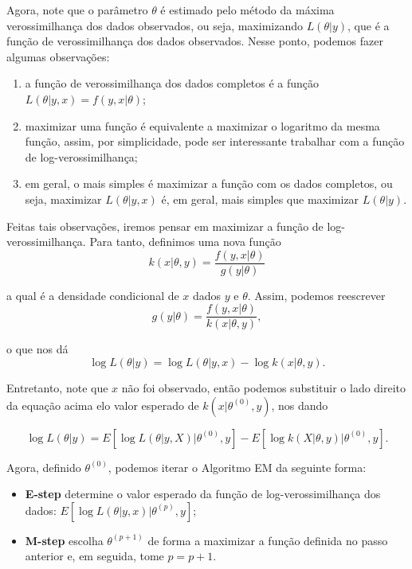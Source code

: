 \documentclass{article}
\begin{document}
Agora, note que o parâmetro $\theta$ é estimado pelo método da máxima verossimilhança dos dados observados, ou seja, maximizando $L(\theta | y)$, que é a função de verossimilhança dos dados observados. Nesse ponto, podemos fazer algumas observações:
\begin{enumerate}
    \item
        a função de verossimilhança dos dados completos é a função $L(\theta | y, x) = f(y, x | \theta)$;
        
    \item
        maximizar uma função é equivalente a maximizar o logaritmo da mesma função, assim, por simplicidade, pode ser interessante trabalhar com a função de log-verossimilhança;
        
    \item
        em geral, o mais simples é maximizar a função com os dados completos, ou seja, maximizar $L(\theta | y, x)$ é, em geral, mais simples que maximizar $L(\theta | y)$.
\end{enumerate}

Feitas tais observações, iremos pensar em maximizar a função de log-verossimilhança. Para tanto, definimos uma nova função
\[k(x | \theta, y) = \dfrac{f(y, x | \theta)}{g(y | \theta)}\]

\noindent a qual é a densidade condicional de $x$ dados $y$ e $\theta$. Assim, podemos reescrever
\[g(y | \theta) = \dfrac{f(y, x | \theta)}{k(x | \theta, y)},\]

\noindent o que nos dá
\[\log{L(\theta | y)} = \log{L(\theta | y, x)} - \log{k(x | \theta, y)}.\]

Entretanto, note que $x$ não foi observado, então podemos substituir o lado direito da equação acima elo valor esperado de $k(x | \theta^{(0)}, y)$, nos dando

\[\log{L(\theta | y)} = E\left[\log{L(\theta | y, X)} | \theta^{(0)}, y\right] - E\left[\log{k(X | \theta, y)} | \theta^{(0)}, y\right].\]

Agora, definido $\theta^{(0)}$, podemos iterar o Algoritmo EM da seguinte forma:
\begin{itemize}
    \item
        {\textbf{E-step}} determine o valor esperado da função de log-verossimilhança dos dados: $E\left[\log{L(\theta | y, x)} | \theta^{(p)}, y\right]$;
        
    \item
        {\textbf{M-step}} escolha $\theta^{(p + 1)}$ de forma a maximizar a função definida no passo anterior e, em seguida, tome $p = p + 1$.
\end{itemize}
\end{document}
